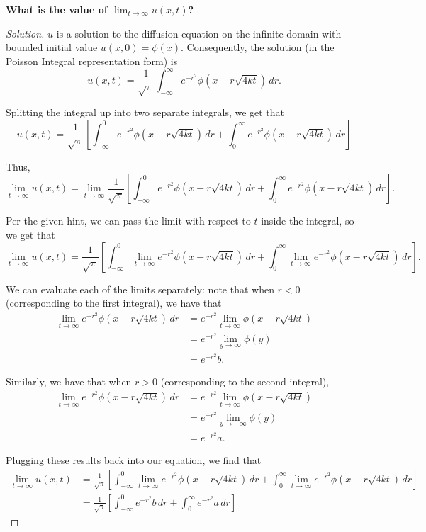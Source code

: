 \documentclass[11pt]{article}
\newenvironment{solution}
  {\renewcommand\qedsymbol{$\blacksquare$}\begin{proof}[Solution]}
  {\end{proof}}
\begin{document}
\begin{enumerate}
\begin{enumerate}
\textbf{What is the value of $\lim_{t\rightarrow \infty} u(x, t)$?}

\begin{solution}
$u$ is a solution to the diffusion equation on the infinite domain with bounded initial value $u(x, 0) = \phi(x)$. Consequently, the solution (in the Poisson Integral representation form) is 
\[ u(x, t) = \frac{1}{\sqrt{\pi}} \int_{-\infty}^{\infty} e^{-r^2} \phi(x-r\sqrt{4kt}) \, dr.\]

Splitting the integral up into two separate integrals, we get that
\[ u(x, t) = \frac{1}{\sqrt{\pi}} \left[\int_{-\infty}^{0} e^{-r^2} \phi(x-r\sqrt{4kt}) \, dr + \int_{0}^{\infty} e^{-r^2} \phi(x-r\sqrt{4kt}) \, dr \right] \]

Thus,\[ \lim_{t \rightarrow \infty} u(x, t) = \lim_{t \rightarrow \infty} \frac{1}{\sqrt{\pi}} \left[\int_{-\infty}^{0} e^{-r^2} \phi(x-r\sqrt{4kt}) \, dr + \int_{0}^{\infty} e^{-r^2} \phi(x-r\sqrt{4kt}) \, dr \right]. \]

Per the given hint, we can pass the limit with respect to $t$ inside the integral, so we get that
\[ \lim_{t \rightarrow \infty} u(x, t) = \frac{1}{\sqrt{\pi}} \left[\int_{-\infty}^{0} \lim_{t \rightarrow \infty} e^{-r^2} \phi(x-r\sqrt{4kt}) \, dr + \int_{0}^{\infty} \lim_{t \rightarrow \infty} e^{-r^2} \phi(x-r\sqrt{4kt}) \, dr \right]. \]

We can evaluate each of the limits separately: note that when $r < 0$ (corresponding to the first integral), we have that
\begin{align*}\lim_{t \rightarrow \infty} e^{-r^2} \phi(x-r\sqrt{4kt}) \, dr &= e^{-r^2} \lim_{t \rightarrow \infty} \phi(x-r\sqrt{4kt}) \\
&= e^{-r^2} \lim_{y \rightarrow \infty} \phi(y) \\
&= e^{-r^2} b.\end{align*}

Similarly, we have that when $r > 0$ (corresponding to the second integral),
\begin{align*}\lim_{t \rightarrow \infty} e^{-r^2} \phi(x-r\sqrt{4kt}) \, dr &= e^{-r^2} \lim_{t \rightarrow \infty} \phi(x-r\sqrt{4kt}) \\
	&= e^{-r^2} \lim_{y \rightarrow -\infty} \phi(y) \\
	&= e^{-r^2} a.\end{align*}

Plugging these results back into our equation, we find that
\begin{align*} \lim_{t \rightarrow \infty} u(x, t) &= \frac{1}{\sqrt{\pi}} \left[\int_{-\infty}^{0} \lim_{t \rightarrow \infty} e^{-r^2} \phi(x-r\sqrt{4kt}) \, dr + \int_{0}^{\infty} \lim_{t \rightarrow \infty} e^{-r^2} \phi(x-r\sqrt{4kt}) \, dr \right] \\
&= 	\frac{1}{\sqrt{\pi}} \left[\int_{-\infty}^{0} e^{-r^2} b \, dr + \int_{0}^{\infty} e^{-r^2} a  \, dr  \right]
\end{align*}


\end{solution}
\end{enumerate}
\end{enumerate}
\end{document}
